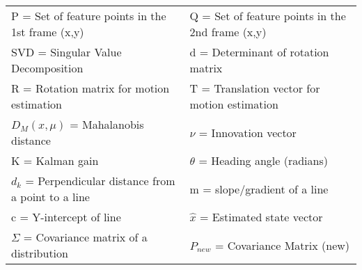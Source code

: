 \begin{table}[h!]
\centering
\begin{tabular}{>{\raggedright\arraybackslash}p{8cm} p{8cm}}
\midrule
P = Set of feature points in the 1st frame (x,y) & Q = Set of feature points in the 2nd frame (x,y) \\
SVD = Singular Value Decomposition & d = Determinant of rotation matrix \\
R = Rotation matrix for motion estimation & T = Translation vector for motion estimation \\
$D_{M}(x,\mu)$ = Mahalanobis distance & $\nu$ = Innovation vector \\
K = Kalman gain & $\theta$ = Heading angle (radians) \\
$d_k$ = Perpendicular distance from a point to a line & m = slope/gradient of a line \\
c = Y-intercept of line & $\hat{x}$ = Estimated state vector \\
$\Sigma$ = Covariance matrix of a distribution & $P_{new}$ = Covariance Matrix (new)\\
\bottomrule
\end{tabular}
\end{table}